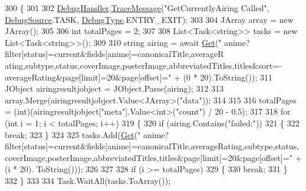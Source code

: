 \begin{DoxyCode}
300         \{
301 
302             \mbox{\hyperlink{class_little_weeb_library_1_1_handlers_1_1_kitsu_handler_a6d3c55fa5eee15320845c2d902c96882}{DebugHandler}}.\mbox{\hyperlink{interface_little_weeb_library_1_1_handlers_1_1_i_debug_handler_a2e405bc3492e683cd3702fae125221bc}{TraceMessage}}(\textcolor{stringliteral}{"GetCurrentlyAiring Called"}, 
      \mbox{\hyperlink{namespace_little_weeb_library_1_1_handlers_a2a6ca0775121c9c503d58aa254d292be}{DebugSource}}.TASK, \mbox{\hyperlink{namespace_little_weeb_library_1_1_handlers_ab66019ed40462876ec4e61bb3ccb0a62}{DebugType}}.ENTRY\_EXIT);
303 
304             JArray array = \textcolor{keyword}{new} JArray();
305 
306             \textcolor{keywordtype}{int} totalPages = 2;
307 
308             List<Task<string>> tasks = \textcolor{keyword}{new} List<Task<string>>();
309 
310             \textcolor{keywordtype}{string} airing = await \mbox{\hyperlink{class_little_weeb_library_1_1_handlers_1_1_kitsu_handler_a8b7c629a03096c3152252f6b5cf2937f}{Get}}(\textcolor{stringliteral}{"
      anime?filter[status]=current&fields[anime]=canonicalTitle,averageR
      ating,subtype,status,coverImage,posterImage,abbreviatedTitles,titles&sort=-averageRating&page[limit]=20&page[offset]="} + (0 * 20).ToString());
311             JObject airingresultjobject = JObject.Parse(airing);
312 
313             array.Merge(airingresultjobject.Value<JArray>(\textcolor{stringliteral}{"data"}));
314 
315 
316             totalPages = (int)(airingresultjobject[\textcolor{stringliteral}{"meta"}].Value<int>(\textcolor{stringliteral}{"count"}) / 20 - 0.5);
317 
318             \textcolor{keywordflow}{for} (\textcolor{keywordtype}{int} i = 1; i < totalPages; i++)
319             \{
320                 \textcolor{keywordflow}{if} (airing.Contains(\textcolor{stringliteral}{"failed:"}))
321                 \{
322                     \textcolor{keywordflow}{break};
323                 \}
324 
325                 tasks.Add(\mbox{\hyperlink{class_little_weeb_library_1_1_handlers_1_1_kitsu_handler_a8b7c629a03096c3152252f6b5cf2937f}{Get}}(\textcolor{stringliteral}{"
      anime?filter[status]=current&fields[anime]=canonicalTitle,averageRating,subtype,status,coverImage,posterImage,abbreviatedTitles,titles&page[limit]=20&page[offset]="} + (i * 20).
      ToString()));
326 
327 
328                 \textcolor{keywordflow}{if} (i >= totalPages)
329                 \{
330                     \textcolor{keywordflow}{break};
331                 \}
332             \}
333 
334             Task.WaitAll(tasks.ToArray());

\end{DoxyCode}
